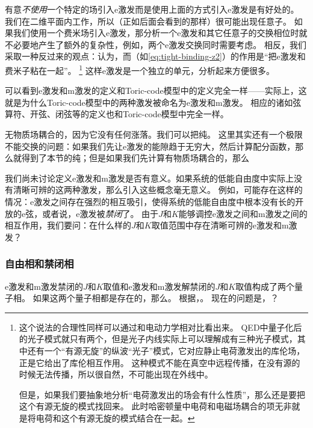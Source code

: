 有意\emph{不使用}一个特定的场引入e激发而是使用上面的方式引入e激发是有好处的。
我们在二维平面内工作，所以（正如后面会看到的那样）很可能出现任意子。
如果我们使用一个费米场引入e激发，那分析一个e激发和其它任意子的交换相位时就不必要地产生了额外的复杂性，例如，两个e激发交换同时需要考虑。
相反，我们采取一种反过来的观点：认为，而（如\eqref{eq:tight-binding-z2}）的作用是“把e激发和费米子粘在一起”。%
\footnote{
    这个说法的合理性同样可以通过和电动力学相对比看出来。
    QED中量子化后的光子模式就只有两个，但是光子内线实际上可以理解成有三种光子模式，其中还有一个“有源无旋”的纵波“光子”模式，它对应静止电荷激发出的库伦场，正是它给出了库伦相互作用。
    这种模式不能在真空中远程传播，在没有源的时候无法传播，所以很自然，不可能出现在外线中。

    但是，如果我们要抽象地分析“电荷激发出的场会有什么性质”，那么还是要把这个有源无旋的模式找回来。
    此时哈密顿量中电荷和电磁场耦合的项无非就是将电荷和这个有源无旋的模式结合在一起。
}%
这样e激发是一个独立的单元，分析起来方便很多。

可以看到e激发和m激发的定义和Toric-code模型中的定义完全一样——实际上，这就是为什么Toric-code模型中的两种激发被命名为e激发和m激发。
相应的诸如弦算符、开弦、闭弦等的定义也和Toric-code模型中完全一样。

无物质场耦合的，因为它没有任何涨落。我们可以把纯。
这里其实还有一个极限不能交换的问题：如果我们先让e激发的能隙趋于无穷大，然后计算配分函数，那么就得到了本节的纯；但是如果我们先计算有物质场耦合的，那么 %

我们尚未讨论定义e激发和m激发是否有意义。如果系统的低能自由度中实际上没有清晰可辨的这两种激发，那么引入这些概念毫无意义。
例如，可能存在这样的情况：e激发之间存在强烈的相互吸引，使得系统的低能自由度中根本没有长的开放的e弦，或者说，e激发被\emph{禁闭}了。
由于$J$和$K$能够调控e激发之间和m激发之间的相互作用，我们要问：在什么样的$J$和$K$取值范围中存在清晰可辨的e激发和m激发？

\subsubsection{自由相和禁闭相}

e激发和m激发禁闭的$J$和$K$取值和e激发和m激发解禁闭的$J$和$K$取值构成了两个量子相。
如果这两个量子相都是存在的，那么。
根据，。
现在的问题是，？

